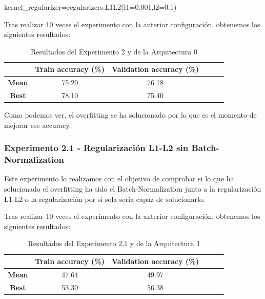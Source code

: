 \documentclass{article}
\begin{document}
            kernel\_regularizer=regularizers.L1L2(l1=0.001,l2=0.1)
			
			
			Tras realizar 10 veces el experimento con la anterior configuraci\'on, obtenemos los siguientes resultados:
			\begin{table}[!h]
				\begin{center}
					\begin{tabular}{ c | c | c | c | c | c |}
						\ & \textbf{Train accuracy (\%)} & \textbf{Validation accuracy (\%)}  \\ \hline
						\textbf{Mean} & 75.20 & 76.18 \\ \hline
						\textbf{Best} & 78.10 & 75.40 \\ \hline
					\end{tabular}
					\caption{Resultados del Experimento 2 y de la Arquitectura 0}
					\label{tab:res-j-a0-e1}
				\end{center}
			\end{table}
		    
		    Como podemos ver, el overfitting se ha solucionado por lo que es el momento de mejorar ese accuracy.
      
      \subsubsection{Experimento 2.1 - Regularizaci\'on L1-L2 sin Batch-Normalization}
		\label{j-s-a0-e2.1} %
			Este experimento lo realizamos con el objetivo de comprobar si lo que ha solucionado el overfitting ha sido el Batch-Normalization junto a la regularizaci\'on L1-L2 o la regularizaci\'on por si sola ser\'ia capaz de solucionarlo.
			
			Tras realizar 10 veces el experimento con la anterior configuraci\'on, obtenemos los siguientes resultados:
			\begin{table}[!h]
				\begin{center}
					\begin{tabular}{ c | c | c | c | c | c |}
						\ & \textbf{Train accuracy (\%)} & \textbf{Validation accuracy (\%)}  \\ \hline
						\textbf{Mean} & 47.64 & 49.97 \\ \hline
						\textbf{Best} & 53.30 & 56.38 \\ \hline
					\end{tabular}
					\caption{Resultados del Experimento 2.1 y de la Arquitectura 1}
					\label{tab:res-j-a0-e2.1}
				\end{center}
			\end{table}
      
\end{document}
